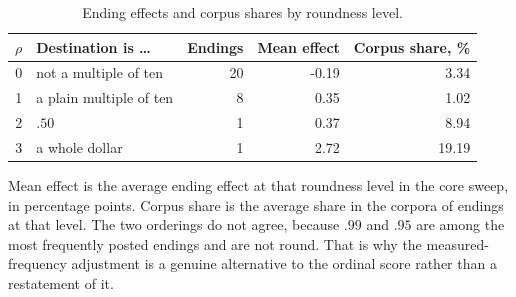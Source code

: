 \begin{table}[t]
\centering
\caption{Ending effects and corpus shares by roundness level.}
\label{tab:roundlev}
\small
\begin{tabular}{rlrrr}
\toprule
$\rho$ & Destination is \dots & Endings & Mean effect & Corpus share, \% \\
\midrule
0 & not a multiple of ten & 20 & -0.19 & 3.34 \\
1 & a plain multiple of ten & 8 & 0.35 & 1.02 \\
2 & $.50$ & 1 & 0.37 & 8.94 \\
3 & a whole dollar & 1 & 2.72 & 19.19 \\
\bottomrule
\end{tabular}
\vspace{2pt}
\parbox{\linewidth}{\footnotesize Mean effect is the average ending effect at that roundness level in the core sweep, in percentage points. Corpus share is the average share in the corpora of endings at that level. The two orderings do not agree, because $.99$ and $.95$ are among the most frequently posted endings and are not round. That is why the measured-frequency adjustment is a genuine alternative to the ordinal score rather than a restatement of it.}
\end{table}
